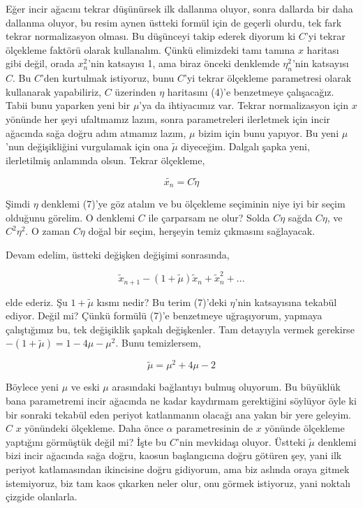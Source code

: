 \documentclass[12pt,fleqn]{article}\usepackage{../../common}
\begin{document}
Eğer incir ağacını tekrar düşünürsek ilk dallanma oluyor, sonra dallarda bir
daha dallanma oluyor, bu resim aynen üstteki formül için de geçerli olurdu, tek
fark tekrar normalizasyon olması. Bu düşünceyi takip ederek diyorum ki $C$'yi
tekrar ölçekleme faktörü olarak kullanalım. Çünkü elimizdeki tamı tamına $x$
haritası gibi değil, orada $x_n^2$'nin katsayısı 1, ama biraz önceki denklemde
$\eta_n^2$'nin katsayısı $C$. Bu $C$'den kurtulmak istiyoruz, bunu $C$'yi tekrar
ölçekleme parametresi olarak kullanarak yapabiliriz, $C$ üzerinden $\eta$
haritasını (4)'e benzetmeye çalışacağız. Tabii bunu yaparken yeni bir $\mu$'ya
da ihtiyacımız var. Tekrar normalizasyon için $x$ yönünde her şeyi ufaltmamız
lazım, sonra parametreleri ilerletmek için incir ağacında sağa doğru adım
atmamız lazım, $\mu$ bizim için bunu yapıyor. Bu yeni $\mu$'nun değişikliğini
vurgulamak için ona $\tilde{\mu}$ diyeceğim. Dalgalı şapka yeni, ilerletilmiş
anlamında olsun. Tekrar ölçekleme,

$$ \tilde{x_n} = C \tilde{\eta}  $$

Şimdi $\eta$ denklemi (7)'ye göz atalım ve bu ölçekleme seçiminin niye iyi
bir seçim olduğunu görelim. O denklemi $C$ ile çarparsam ne olur? Solda
$C \eta$ sağda $C \eta$, ve $C^2 \eta^2$. O zaman $C \eta$ doğal bir seçim,
herşeyin temiz çıkmasını sağlayacak.

Devam edelim, üstteki değişken değişimi sonrasında,

$$ \tilde{x}_{n+1}  -(1+\tilde{\mu})\tilde{x}_n + \tilde{x}_n^2 + ... $$

elde ederiz. Şu $1+\tilde{\mu}$ kısmı nedir? Bu terim (7)'deki $\eta$'nin
katsayısına tekabül ediyor. Değil mi? Çünkü formülü (7)'e benzetmeye
uğraşıyorum, yapmaya çalıştığımız bu, tek değişiklik şapkalı değişkenler. Tam
detayıyla vermek gerekirse $-(1+\tilde{\mu}) = 1-4\mu - \mu^2$. Bunu
temizlersem,

$$ \tilde{\mu} = \mu^2 + 4\mu - 2$$

Böylece yeni $\mu$ ve eski $\mu$ arasındaki bağlantıyı bulmuş oluyorum. Bu
büyüklük bana parametremi incir ağacında ne kadar kaydırmam gerektiğini söylüyor
öyle ki bir sonraki tekabül eden periyot katlanmanın olacağı ana yakın bir yere
geleyim. $C$ $x$ yönündeki ölçekleme. Daha önce $\alpha$ parametresinin de $x$
yönünde ölçekleme yaptığını görmüştük değil mi? İşte bu $C$'nin mevkidaşı
oluyor. Üstteki $\tilde{\mu}$ denklemi bizi incir ağacında sağa doğru, kaosun
başlangıcına doğru götüren şey, yani ilk periyot katlamasından ikincisine doğru
gidiyorum, ama biz aslında oraya gitmek istemiyoruz, biz tam kaos çıkarken neler
olur, onu görmek istiyoruz, yani noktalı çizgide olanlarla.
\end{document}
